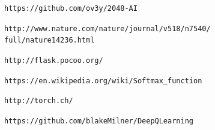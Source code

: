 \documentclass[9pt,twocolumn]{article}
\begin{document}
\begin{thebibliography}{9}

 \texttt{https://github.com/ov3y/2048-AI}

 \texttt{http://www.nature.com/nature/journal/v518/n7540/\\full/nature14236.html}

 \texttt{http://flask.pocoo.org/}

 \texttt{https://en.wikipedia.org/wiki/Softmax\_function}

 \texttt{http://torch.ch/}

 \texttt{https://github.com/blakeMilner/DeepQLearning}

\end{thebibliography}
\end{document}
